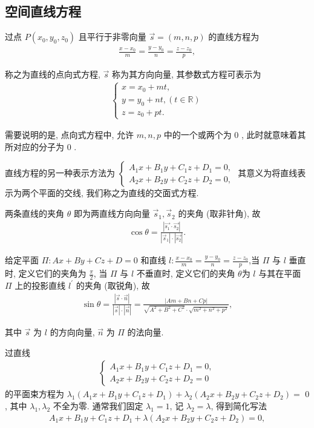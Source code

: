 \subsection{空间直线方程}
过点 $P\left(x_0, y_0, z_0\right)$ 且平行于非零向量 $\vec{s}=(m, n, p)$ 的直线方程为
\begin{align*}
	\frac{x-x_0}{m}=\frac{y-y_0}{n}=\frac{z-z_0}{p},
\end{align*}

称之为直线的点向式方程, $\vec{s}$ 称为其方向向量, 其参数式方程可表示为
\begin{align*}
	\left\{\begin{array}{l}
		       x=x_0+m t,                   \\
		       y=y_0+n t,(t \in \mathbb{R}) \\
		       z=z_0+p t .
	       \end{array}\right.
\end{align*}

需要说明的是, 点向式方程中, 允许 $m ,  n ,  p$ 中的一个或两个为 0 , 此时就意味着其所对应的分子为 0 .

直线方程的另一种表示方法为 $\left\{\begin{array}{l}A_1 x+B_1 y+C_1 z+D_1=0, \\ A_2 x+B_2 y+C_2 z+D_2=0,\end{array}\right.$ 其意义为将直线表示为两个平面的交线, 我们称之为直线的交面式方程.

两条直线的夹角 $\theta$ 即为两直线方向向量 $\vec{s}_1 ,  \vec{s}_2$ 的夹角 (取非针角), 故
\begin{align*}
	\cos \theta=\frac{\left|\overrightarrow{s_1} \cdot \overrightarrow{s_2}\right|}{\left|\vec{s}_1\right| \cdot\left|\overrightarrow{s_2}\right|} .
\end{align*}

给定平面 $\Pi: A x+B y+C z+D=0$ 和直线 $l: \frac{x-x_0}{m}=\frac{y-y_0}{n}=\frac{z-z_0}{p}$,当 $\Pi$ 与 $l$ 垂直时, 定义它们的夹角为 $\frac{\pi}{2}$, 当 $\Pi$ 与 $l$ 不垂直时, 定义它们的夹角 $\theta$为 $l$ 与其在平面 $\Pi$ 上的投影直线 $l^{\prime}$ 的夹角 (取锐角), 故
\begin{align*}
	\sin \theta=\frac{|\vec{s} \cdot \vec{n}|}{|\vec{s}| \cdot|\vec{n}|}=\frac{|A m+B n+C p|}{\sqrt{A^2+B^2+C^2} \cdot \sqrt{m^2+n^2+p^2}},
\end{align*}

其中 $\vec{s}$ 为 $l$ 的方向向量, $\vec{n}$ 为 $\Pi$ 的法向量.

过直线
\begin{align*}
	\left\{\begin{array}{l}
		       A_1 x+B_1 y+C_1 z+D_1=0, \\
		       A_2 x+B_2 y+C_2 z+D_2=0
	       \end{array}\right.
\end{align*}
的平面束方程为 $\lambda_1\left(A_1 x+B_1 y+C_1 z+D_1\right)+\lambda_2\left(A_2 x+B_2 y+C_2 z+D_2\right)=$ 0 , 其中 $\lambda_1 ,  \lambda_2$ 不全为零. 通常我们固定 $\lambda_1=1$, 记 $\lambda_2=\lambda$, 得到简化写法
\begin{align*}
	A_1 x+B_1 y+C_1 z+D_1+\lambda\left(A_2 x+B_2 y+C_2 z+D_2\right)=0,
\end{align*}


